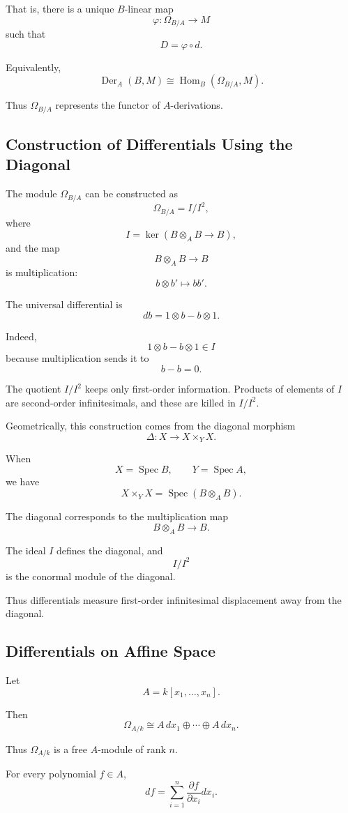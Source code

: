 \documentclass[12pt,a4paper]{article}
\theoremstyle{notespace}
\begin{document}
That is, there is a unique $B$-linear map
\[
\varphi:\Omega_{B/A}\to M
\]
such that
\[
D=\varphi\circ d.
\]

Equivalently,
\[
\operatorname{Der}_A(B,M)
\cong
\operatorname{Hom}_B(\Omega_{B/A},M).
\]

Thus $\Omega_{B/A}$ represents the functor of $A$-derivations.

\subsection{Construction of Differentials Using the Diagonal}

The module $\Omega_{B/A}$ can be constructed as
\[
\Omega_{B/A}=I/I^2,
\]
where
\[
I=\ker(B\otimes_A B\to B),
\]
and the map
\[
B\otimes_A B\to B
\]
is multiplication:
\[
b\otimes b'\longmapsto bb'.
\]

The universal differential is
\[
db=1\otimes b-b\otimes1.
\]

Indeed,
\[
1\otimes b-b\otimes1\in I
\]
because multiplication sends it to
\[
b-b=0.
\]

The quotient $I/I^2$ keeps only first-order information. Products of elements
of $I$ are second-order infinitesimals, and these are killed in $I/I^2$.

Geometrically, this construction comes from the diagonal morphism
\[
\Delta:X\to X\times_Y X.
\]

When
\[
X=\operatorname{Spec}B,
\qquad
Y=\operatorname{Spec}A,
\]
we have
\[
X\times_Y X=\operatorname{Spec}(B\otimes_A B).
\]

The diagonal corresponds to the multiplication map
\[
B\otimes_A B\to B.
\]

The ideal $I$ defines the diagonal, and
\[
I/I^2
\]
is the conormal module of the diagonal.

Thus differentials measure first-order infinitesimal displacement away from
the diagonal.

\subsection{Differentials on Affine Space}

Let
\[
A=k[x_1,\ldots,x_n].
\]

Then
\[
\Omega_{A/k}
\cong
A\,dx_1\oplus\cdots\oplus A\,dx_n.
\]

Thus $\Omega_{A/k}$ is a free $A$-module of rank $n$.

For every polynomial $f\in A$,
\[
df
=
\sum_{i=1}^n
\frac{\partial f}{\partial x_i}dx_i.
\]
\end{document}

